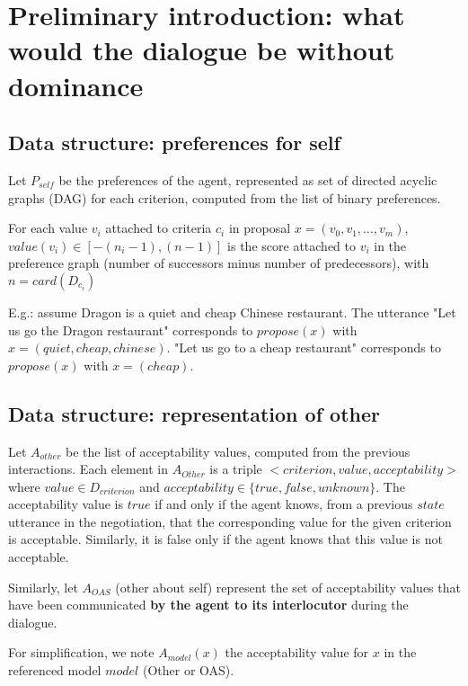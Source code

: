 \documentclass{article}
\begin{document}
		\title{\vskip -10pt}
		
		\author{Lydia Ould Ouali, Charles Rich \and
		Nicolas Sabouret }
		
	
	\section{Preliminary introduction: what would the dialogue be without dominance}
	
	\subsection{Data structure: preferences for self}
	Let $P_{self}$ be the preferences of the agent, represented as set of directed acyclic graphs (DAG) for each criterion, computed from the list of binary preferences.
	
	For each value $v_i$ attached to criteria $c_i$ in proposal $x=(v_0,v_1,\ldots,v_m)$, $value(v_i)\in[-(n_i-1),(n-1)]$ is the score attached to $v_i$ in the preference graph (number of successors minus number of predecessors), with $n=card(D_{c_i})$
	
	E.g.: assume Dragon is a quiet and cheap Chinese restaurant. The utterance "Let us go the Dragon restaurant" corresponds to $propose(x)$ with $x=(quiet,cheap,chinese)$. "Let us go to a cheap restaurant" corresponds to $propose(x)$ with $x=(cheap)$.
	
	\subsection{Data structure: representation of other}
	Let $A_{other}$ be the list of acceptability values, computed from the previous interactions. Each element in $A_{Other}$ is a triple $<criterion,value,acceptability>$ where $value\in D_{criterion}$ and $acceptability\in\{true,false,unknown\}$. The acceptability value is $true$ if and only if the agent knows, from a previous $state$ utterance in the negotiation, that the corresponding value for the given criterion is acceptable. Similarly, it is false only if the agent knows that this value is not acceptable.
	
	Similarly, let $A_{OAS}$ (other about self) represent the set of acceptability values that have been communicated \textbf{by the agent to its interlocutor} during the dialogue.
	
	For simplification, we note $A_{model}(x)$ the acceptability value for $x$ in the referenced model $model$ (Other or OAS).
	
\end{document}
